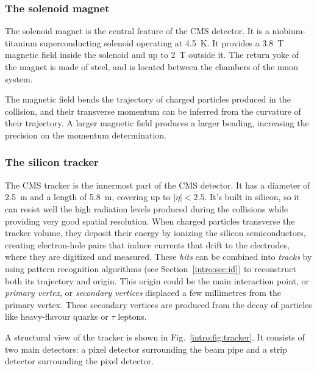 \documentclass[../main.tex]{subfiles}
\begin{document}
\subsubsection{The solenoid magnet}

The solenoid magnet is the central feature of the CMS detector. It is a niobium-titanium superconducting solenoid operating at 4.5~K. It provides a 3.8~T magnetic field inside the solenoid and up to 2~T outside it. The return yoke of the magnet is made of steel, and is located between the chambers of the muon system.

The magnetic field bends the trajectory of charged particles produced in the collision, and their transverse momentum can be inferred from the curvature of their trajectory. A larger magnetic field produces a larger bending, increasing the precision on the momentum determination. 

\subsubsection{The silicon tracker}

The CMS tracker \cite{intro:exp:tracker1, intro:exp:tracker2} is the innermost part of the CMS detector. It has a diameter of 2.5~m and a length of 5.8~m, covering up to $|\eta|<2.5$. It's built in silicon, so it can resist well the high radiation levels produced during the collisions while providing very good spatial resolution. When charged particles transverse the tracker volume, they deposit their energy by ionizing the silicon semiconductors, creating electron-hole pairs that induce currents that drift to the electrodes, where they are digitized and measured. These \textit{hits} can be combined into \textit{tracks} by using pattern recognition algorithms (see Section~\ref{intro:sec:id}) to reconstruct both its trajectory and origin. This origin could be the main interaction point, or \textit{primary vertex}, or \textit{secondary vertices} displaced a few millimetres from the primary vertex. These secondary vertices are produced from the decay of particles like heavy-flavour quarks or $\tau$ leptons.

A structural view of the tracker is shown in Fig.~\ref{intro:fig:tracker}. It consists of two main detectors: a pixel detector surrounding the beam pipe and a strip detector surrounding the pixel detector.
\end{document}
